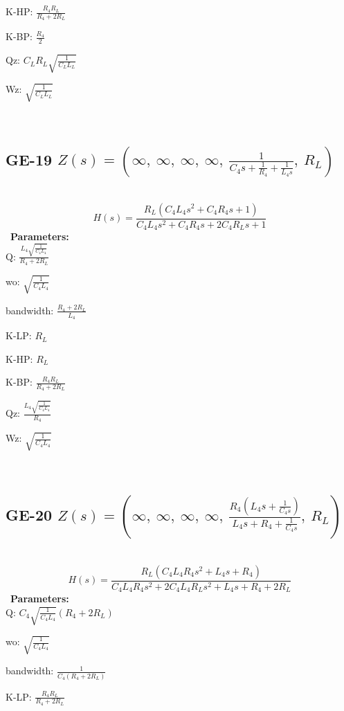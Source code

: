 \documentclass{article}
\begin{document}
K-HP: $\frac{R_{4} R_{L}}{R_{4} + 2 R_{L}}$\ 

K-BP: $\frac{R_{4}}{2}$\ 

Qz: $C_{L} R_{L} \sqrt{\frac{1}{C_{L} L_{L}}}$\ 

Wz: $\sqrt{\frac{1}{C_{L} L_{L}}}$\ 

\ 

\subsection{GE-19 $Z(s) = \left( \infty, \  \infty, \  \infty, \  \infty, \  \frac{1}{C_{4} s + \frac{1}{R_{4}} + \frac{1}{L_{4} s}}, \  R_{L}\right)$ } \ 
\textbf{\[H(s) = \frac{R_{L} \left(C_{4} L_{4} s^{2} + C_{4} R_{4} s + 1\right)}{C_{4} L_{4} s^{2} + C_{4} R_{4} s + 2 C_{4} R_{L} s + 1}\] } \ 
\textbf{Parameters:}\\ 

Q: $\frac{L_{4} \sqrt{\frac{1}{C_{4} L_{4}}}}{R_{4} + 2 R_{L}}$\ 

wo: $\sqrt{\frac{1}{C_{4} L_{4}}}$\ 

bandwidth: $\frac{R_{4} + 2 R_{L}}{L_{4}}$\ 

K-LP: $R_{L}$\ 

K-HP: $R_{L}$\ 

K-BP: $\frac{R_{4} R_{L}}{R_{4} + 2 R_{L}}$\ 

Qz: $\frac{L_{4} \sqrt{\frac{1}{C_{4} L_{4}}}}{R_{4}}$\ 

Wz: $\sqrt{\frac{1}{C_{4} L_{4}}}$\ 

\ 

\subsection{GE-20 $Z(s) = \left( \infty, \  \infty, \  \infty, \  \infty, \  \frac{R_{4} \left(L_{4} s + \frac{1}{C_{4} s}\right)}{L_{4} s + R_{4} + \frac{1}{C_{4} s}}, \  R_{L}\right)$ } \ 
\textbf{\[H(s) = \frac{R_{L} \left(C_{4} L_{4} R_{4} s^{2} + L_{4} s + R_{4}\right)}{C_{4} L_{4} R_{4} s^{2} + 2 C_{4} L_{4} R_{L} s^{2} + L_{4} s + R_{4} + 2 R_{L}}\] } \ 
\textbf{Parameters:}\\ 

Q: $C_{4} \sqrt{\frac{1}{C_{4} L_{4}}} \left(R_{4} + 2 R_{L}\right)$\ 

wo: $\sqrt{\frac{1}{C_{4} L_{4}}}$\ 

bandwidth: $\frac{1}{C_{4} \left(R_{4} + 2 R_{L}\right)}$\ 

K-LP: $\frac{R_{4} R_{L}}{R_{4} + 2 R_{L}}$\ 
\end{document}
